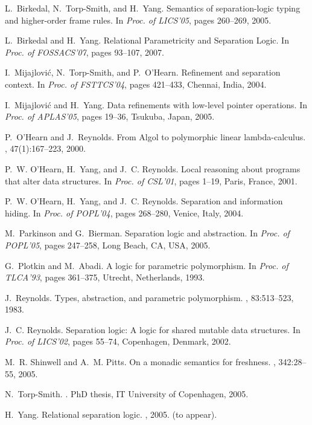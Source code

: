 \documentclass{LMCS}
\begin{document}
\begin{thebibliography}{10}
L.~Birkedal, N.~Torp-Smith, and H.~Yang.
\newblock Semantics of separation-logic typing and higher-order frame rules.
\newblock In {\em Proc. of LICS'05}, pages 260--269, 2005.

L.~Birkedal and H.~Yang.
\newblock Relational Parametricity and Separation Logic.
\newblock In {\em Proc. of FOSSACS'07}, pages 93--107, 2007.

I.~Mijajlovi\'c, N.~Torp-Smith, and P.~O'Hearn.
\newblock Refinement and separation context.
\newblock In {\em Proc. of FSTTCS'04}, pages 421--433, Chennai, India, 2004.

I.~Mijajlovi\'c and H.~Yang.
\newblock Data refinements with low-level pointer operations.
\newblock In {\em Proc. of APLAS'05}, pages 19--36, Tsukuba, Japan, 2005.

P.~O'Hearn and J.~Reynolds.
\newblock From {A}lgol to polymorphic linear lambda-calculus.
, 47(1):167--223, 2000.

P.~W. O'Hearn, H.~Yang, and J.~C. Reynolds.
\newblock Local reasoning about programs that alter data structures.
\newblock In {\em Proc. of CSL'01}, pages 1--19, Paris, France, 2001.

P.~W. O'Hearn, H.~Yang, and J.~C. Reynolds.
\newblock Separation and information hiding.
\newblock In {\em Proc. of POPL'04}, pages 268--280, Venice, Italy, 2004.

M.~Parkinson and G.~Bierman.
\newblock Separation logic and abstraction.
\newblock In {\em Proc. of POPL'05}, pages 247--258, Long Beach, CA, USA, 2005.

G.~Plotkin and M.~Abadi.
\newblock A logic for parametric polymorphism.
\newblock In {\em Proc. of TLCA'93}, pages 361--375, Utrecht, Netherlands,
  1993.

J.~Reynolds.
\newblock Types, abstraction, and parametric polymorphism.
, 83:513--523, 1983.

J.~C. Reynolds.
\newblock Separation logic: A logic for shared mutable data structures.
\newblock In {\em Proc. of LICS'02}, pages 55--74, Copenhagen, Denmark, 2002.

M.~R. Shinwell and A.~M. Pitts.
\newblock On a monadic semantics for freshness.
, 342:28--55, 2005.

N.~Torp-Smith.
.
\newblock PhD thesis, IT University of Copenhagen, 2005.

H.~Yang.
\newblock Relational separation logic.
, 2005.
\newblock (to appear).

\end{thebibliography}
\end{document}
